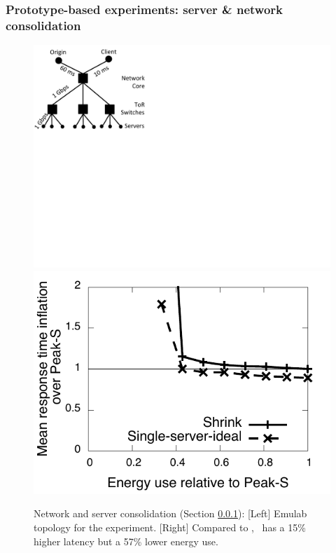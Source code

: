 \subsubsection{Prototype-based experiments: server \& network consolidation}
\label{sec:emulab}

\begin{figure}
	\centering
\includegraphics[scale=0.35]{figures/emulab-topo.pdf}
\includegraphics[scale=0.5]{graphs/final/emulab-mean.pdf}
\caption{Network and server consolidation (Section \ref{sec:emulab}): [Left] Emulab topology for the experiment. [Right] Compared to \peakS, \shrink\ has a 15\% higher latency but a 57\% lower energy use.}
\label{fig:emulab}
\end{figure}

